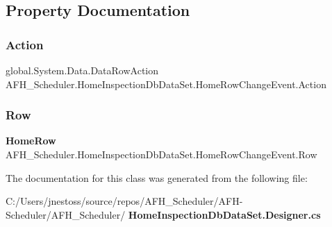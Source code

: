 \subsection{Property Documentation}
\mbox{\label{class_a_f_h___scheduler_1_1_home_inspection_db_data_set_1_1_home_row_change_event_a4de3e399d95cf717ef3d30a5cd6e9162}} 
\subsubsection{Action}
{\footnotesize\ttfamily global.\+System.\+Data.\+Data\+Row\+Action A\+F\+H\+\_\+\+Scheduler.\+Home\+Inspection\+Db\+Data\+Set.\+Home\+Row\+Change\+Event.\+Action\hspace{0.3cm}{\ttfamily [get]}}

\mbox{\label{class_a_f_h___scheduler_1_1_home_inspection_db_data_set_1_1_home_row_change_event_a446c9779ea8fc3f97567666904038a2d}} 
\subsubsection{Row}
{\footnotesize\ttfamily \textbf{ Home\+Row} A\+F\+H\+\_\+\+Scheduler.\+Home\+Inspection\+Db\+Data\+Set.\+Home\+Row\+Change\+Event.\+Row\hspace{0.3cm}{\ttfamily [get]}}



The documentation for this class was generated from the following file\+:\begin{DoxyCompactItemize}
\item 
C\+:/\+Users/jnestoss/source/repos/\+A\+F\+H\+\_\+\+Scheduler/\+A\+F\+H-\/\+Scheduler/\+A\+F\+H\+\_\+\+Scheduler/\textbf{ Home\+Inspection\+Db\+Data\+Set.\+Designer.\+cs}\end{DoxyCompactItemize}
